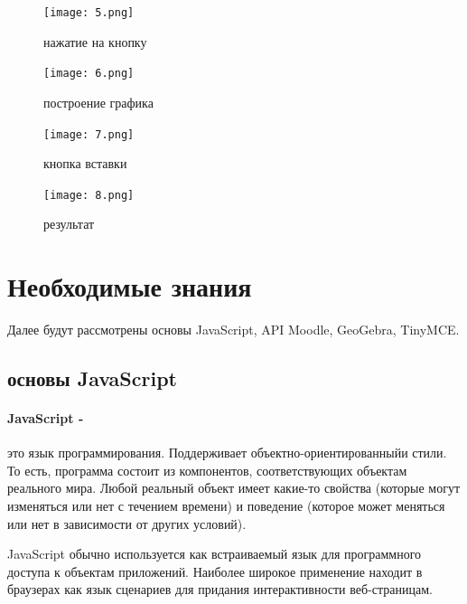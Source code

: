 \documentclass[14pt,Diplom]{diplomwork}
\begin{document}
\begin{figure}
	\begin{center}
	\texttt{[image: 5.png]}\caption{нажатие на кнопку}

	\texttt{[image: 6.png]}\caption{построение графика}

	\texttt{[image: 7.png]}\caption{кнопка вставки}

	\texttt{[image: 8.png]}\caption{результат}
	\end{center}
\end{figure}


\section{Необходимые знания}
	Далее будут рассмотрены основы JavaScript, API Moodle, GeoGebra, TinyMCE.
\subsection{основы JavaScript}

\paragraph{JavaScript -}

это язык программирования. Поддерживает объектно-ориентированныйи стили. То есть, программа состоит из компонентов, соответствующих объектам реального мира. Любой реальный объект имеет какие-то свойства (которые могут изменяться или нет с течением времени) и поведение (которое может меняться или нет в зависимости от других условий). 

JavaScript обычно используется как встраиваемый язык для программного доступа к объектам приложений. Наиболее широкое применение находит в браузерах как язык сценариев для придания интерактивности веб-страницам.
\end{document}
